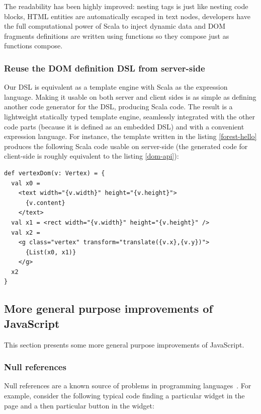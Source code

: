 \documentclass[american,english,runningheads]{llncs}
\begin{document}
The readability has been highly improved: nesting tags is just like nesting code blocks, HTML entities are automatically escaped in text nodes, developers have the full computational power of Scala to inject dynamic data and DOM fragments definitions are written using functions so they compose just as functions compose.

\subsubsection{Reuse the DOM definition DSL from server-side}

Our DSL is equivalent as a template engine with Scala as the expression language. Making it usable on both server and client sides is as simple as defining another code generator for the DSL, producing Scala code. The result is a lightweight statically typed template engine, seamlessly integrated with the other code parts (because it is defined as an embedded DSL) and with a convenient expression language. For instance, the template written in the listing \ref{forest-hello} produces the following Scala code usable on server-side (the generated code for client-side is roughly equivalent to the listing \ref{dom-api}):

\begin{lstlisting}
def vertexDom(v: Vertex) = {
  val x0 =
    <text width="{v.width}" height="{v.height}">
      {v.content}
    </text>
  val x1 = <rect width="{v.width}" height="{v.height}" />
  val x2 =
    <g class="vertex" transform="translate({v.x},{v.y})">
      {List(x0, x1)}
    </g>
  x2
}
\end{lstlisting}

\subsection{More general purpose improvements of JavaScript}

This section presents some more general purpose improvements of JavaScript.

\subsubsection{Null references}

Null references are a known source of problems in programming languages~\cite{Hoare09_Null,Nanda09_Null}. For example, consider the following typical code finding a particular widget in the page and a then particular button in the widget:
\end{document}
